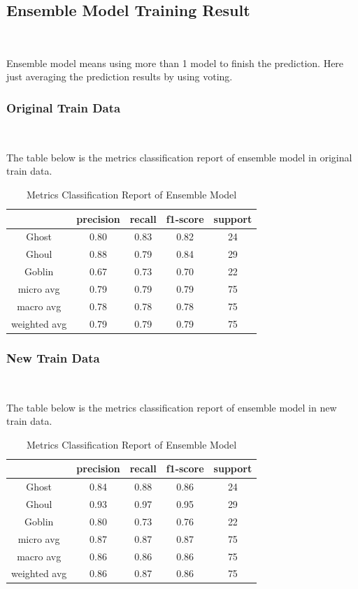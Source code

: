 \subsection{Ensemble Model Training Result}
\

Ensemble model means using 
more than 1 model to finish the prediction.
Here just averaging the prediction results 
by using voting. 

\subsubsection{Original Train Data}
\

The table below is the metrics classification report 
of ensemble model in original train data.

\begin{table}[h]  \centering
	\caption{Metrics Classification Report of Ensemble Model}
	\label{tbl:metrics_classification_ensemble_old}
	\begin{tabular}{ccccc}
		\hline
		& precision  &  recall & f1-score &  support\\
		\hline
		Ghost   &    0.80   &   0.83  & 0.82 & 24\\
		Ghoul  &  0.88  &  0.79  &   0.84   &   29\\
		Goblin  &   0.67  &  0.73 &  0.70  &   22\\
		\hline
		micro avg  &  0.79  &  0.79  & 0.79    &  75\\
		macro avg  &  0.78  & 0.78  &  0.78  &  75\\
		weighted avg  &   0.79  &  0.79 &  0.79  &  75\\
		\hline 
	\end{tabular}
\end{table}
	
\subsubsection{New Train Data}
\

The table below is the metrics classification report 
of ensemble model in new train data.
\begin{table}[h]  \centering
	\caption{Metrics Classification Report of Ensemble Model}
	\label{tbl:metrics_classification_ensemble_new}
	\begin{tabular}{ccccc}
		\hline
		&precision & recall & f1-score & support\\
		\hline
		Ghost  &  0.84  &  0.88  & 0.86 &  24\\
		Ghoul  &  0.93  & 0.97 &  0.95 &   29\\
		Goblin  &  0.80 &  0.73  & 0.76  &  22\\
		\hline
		micro avg & 0.87  & 0.87  & 0.87  & 75\\
		macro avg &  0.86  &  0.86 & 0.86 &   75\\
		weighted avg  &  0.86 & 0.87  &  0.86  &  75\\
		\hline 
	\end{tabular}
\end{table}	

